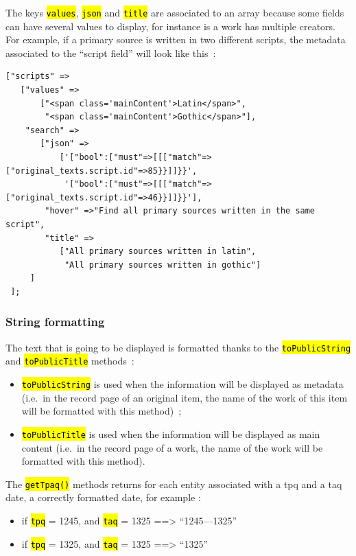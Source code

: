 \documentclass[a4paper,12pt,twoside]{book}
\let\OldTexttt\texttt
\renewcommand{\texttt}[1]{\OldTexttt{\hl{#1}}}
\begin{document}
The keys \texttt{values}, \texttt{json} and \texttt{title} are associated to an array because some fields can have several values to display, for instance is a work has multiple creators. For example, if a primary source is written in two different scripts, the metadata associated to the ``script field'' will look like this~:

\begin{lstlisting}
["scripts" =>
   ["values" =>
       ["<span class='mainContent'>Latin</span>",
        "<span class='mainContent'>Gothic</span>"],
    "search" =>
       ["json" =>
           ['["bool":["must"=>[[["match"=>["original_texts.script.id"=>85}}]]}}',
            '["bool":["must"=>[[["match"=>["original_texts.script.id"=>46}}]]}}'],
        "hover" =>"Find all primary sources written in the same script",
        "title" => 
           ["All primary sources written in latin",
            "All primary sources written in gothic"]
     ]
 ];
\end{lstlisting}

				\subsubsection{String formatting}\label{string-formatting}

The text that is going to be displayed is formatted thanks to the \texttt{toPublicString} and \texttt{toPublicTitle} methods~:
\begin{itemize}
	\item  \texttt{toPublicString} is used when the information will be displayed as metadata (i.e.~in the record page of an original item, the name of the work of this item will be formatted with this method)~;
	\item \texttt{toPublicTitle} is used when the information will be displayed as main content (i.e.~in the record page of a work, the name of the work will be formatted with this method).
\end{itemize}

The \texttt{getTpaq()} methods returns for each entity associated with a tpq and a taq date, a correctly formatted date, for example :
\begin{itemize}
	\item if \texttt{tpq} = 1245, and \texttt{taq} = 1325 ==\textgreater{} ``1245---1325''
	\item if \texttt{tpq} = 1325, and \texttt{taq} = 1325 ==\textgreater{} ``1325''
\end{itemize}
\end{document}
